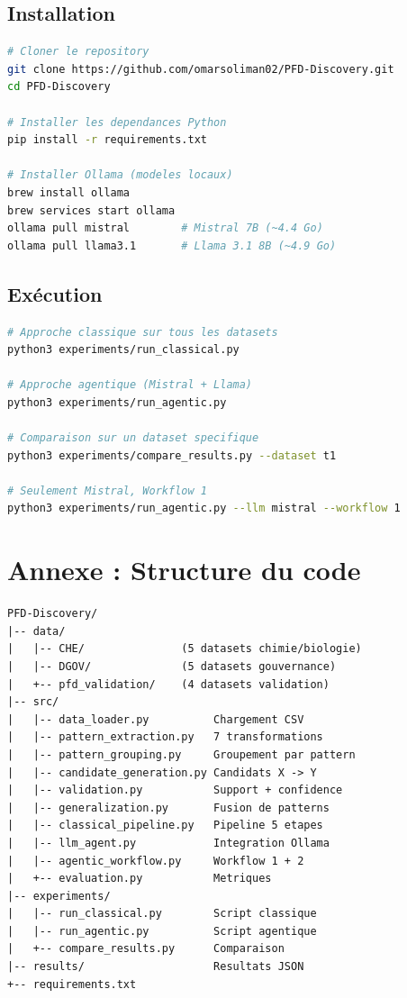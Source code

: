 \documentclass[12pt,a4paper]{article}
\begin{document}
\subsection{Installation}

\begin{lstlisting}[language=bash,caption={Installation du projet}]
# Cloner le repository
git clone https://github.com/omarsoliman02/PFD-Discovery.git
cd PFD-Discovery

# Installer les dependances Python
pip install -r requirements.txt

# Installer Ollama (modeles locaux)
brew install ollama
brew services start ollama
ollama pull mistral        # Mistral 7B (~4.4 Go)
ollama pull llama3.1       # Llama 3.1 8B (~4.9 Go)
\end{lstlisting}

\subsection{Ex\'{e}cution}

\begin{lstlisting}[language=bash,caption={Commandes d'ex\'{e}cution}]
# Approche classique sur tous les datasets
python3 experiments/run_classical.py

# Approche agentique (Mistral + Llama)
python3 experiments/run_agentic.py

# Comparaison sur un dataset specifique
python3 experiments/compare_results.py --dataset t1

# Seulement Mistral, Workflow 1
python3 experiments/run_agentic.py --llm mistral --workflow 1
\end{lstlisting}

\section{Annexe : Structure du code}

\begin{lstlisting}[language={},caption={Arborescence du projet},basicstyle=\ttfamily\scriptsize]
PFD-Discovery/
|-- data/
|   |-- CHE/               (5 datasets chimie/biologie)
|   |-- DGOV/              (5 datasets gouvernance)
|   +-- pfd_validation/    (4 datasets validation)
|-- src/
|   |-- data_loader.py          Chargement CSV
|   |-- pattern_extraction.py   7 transformations
|   |-- pattern_grouping.py     Groupement par pattern
|   |-- candidate_generation.py Candidats X -> Y
|   |-- validation.py           Support + confidence
|   |-- generalization.py       Fusion de patterns
|   |-- classical_pipeline.py   Pipeline 5 etapes
|   |-- llm_agent.py            Integration Ollama
|   |-- agentic_workflow.py     Workflow 1 + 2
|   +-- evaluation.py           Metriques
|-- experiments/
|   |-- run_classical.py        Script classique
|   |-- run_agentic.py          Script agentique
|   +-- compare_results.py      Comparaison
|-- results/                    Resultats JSON
+-- requirements.txt
\end{lstlisting}
\end{document}
